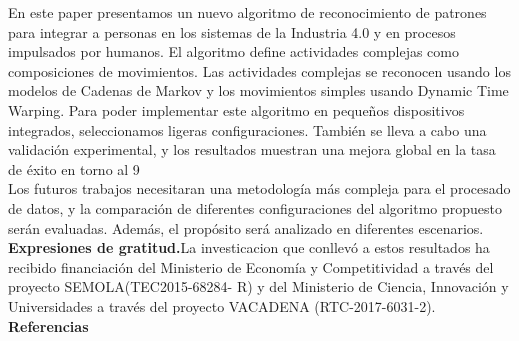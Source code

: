 \documentclass[10pt]{article}
\begin{document}
En este paper presentamos un nuevo algoritmo de reconocimiento de patrones para integrar a personas en los sistemas de la  Industria 4.0 y en procesos impulsados por humanos. El algoritmo define actividades complejas como composiciones de movimientos. Las actividades complejas se reconocen usando los modelos de Cadenas de Markov y los movimientos simples usando Dynamic Time Warping. Para poder implementar este algoritmo en pequeños dispositivos integrados, seleccionamos ligeras configuraciones. También se lleva a cabo una validación experimental, y los resultados muestran una mejora global en la tasa de éxito en torno al 9%
\\
Los futuros trabajos necesitaran una metodología más compleja para el procesado de datos, y la comparación de diferentes configuraciones del algoritmo propuesto serán evaluadas. Además, el propósito será analizado en diferentes escenarios.
\\
\textbf{Expresiones de gratitud.}La investicacion que conllevó a estos resultados ha recibido financiación del Ministerio de Economía y Competitividad a través del proyecto SEMOLA(TEC2015-68284- R) y del Ministerio de Ciencia, Innovación y Universidades a través del proyecto VACADENA (RTC-2017-6031-2).
\\
\textbf{Referencias} 
\end{document}
